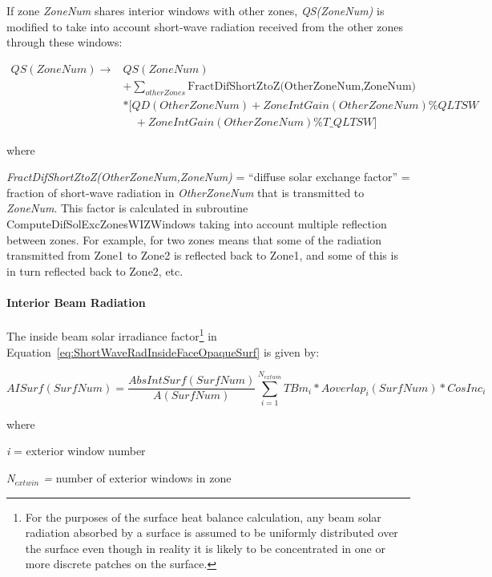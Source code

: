 If zone \emph{ZoneNum} shares interior windows with other zones, \emph{QS(ZoneNum)} is modified to take into account short-wave radiation received from the other zones through these windows:

\begin{equation}
\begin{array}{rl}
   QS(ZoneNum) \to & QS(ZoneNum) \\
                   &+ \sum_{otherZones}\text{FractDifShortZtoZ(OtherZoneNum,ZoneNum)} \\
                   &* [QD(OtherZoneNum) + ZoneIntGain(OtherZoneNum)\% QLTSW \\
                   &\quad + ZoneIntGain(OtherZoneNum)\% T\_QLTSW]
  \end{array}
\end{equation}

where

\emph{FractDifShortZtoZ(OtherZoneNum,ZoneNum)} = ``diffuse solar exchange factor'' = fraction of short-wave radiation in \emph{OtherZoneNum} that is transmitted to \emph{ZoneNum}. This factor is calculated in subroutine ComputeDifSolExcZonesWIZWindows taking into account multiple reflection between zones. For example, for two zones means that some of the radiation transmitted from Zone1 to Zone2 is reflected back to Zone1, and some of this is in turn reflected back to Zone2, etc.

\paragraph{Interior Beam Radiation}\label{interior-beam-radiation}

The inside beam solar irradiance factor\footnote{For the purposes of the surface heat balance calculation, any beam solar radiation absorbed by a surface is assumed to be uniformly distributed over the surface even though in reality it is likely to be concentrated in one or more discrete patches on the surface.} in Equation~\ref{eq:ShortWaveRadInsideFaceOpaqueSurf} is given by:

\begin{equation}
AISurf(SurfNum) = \frac{{AbsIntSurf(SurfNum)}}{{A(SurfNum)}}\sum\limits_{i = 1}^{{N_{extwin}}} {TB{m_i}*Aoverla{p_i}(SurfNum)*CosIn{c_i}}
\end{equation}

where

\emph{i} = exterior window number

\emph{N\(_{extwin}\) =} number of exterior windows in zone

